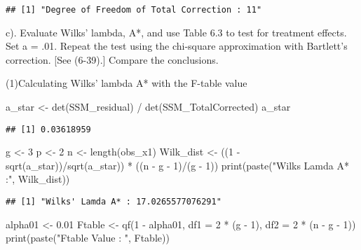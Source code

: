 \documentclass[
]{article}
\newenvironment{Shaded}{\begin{snugshade}}{\end{snugshade}}
\newcommand{\AttributeTok}[1]{\textcolor[rgb]{0.77,0.63,0.00}{#1}}
\newcommand{\DecValTok}[1]{\textcolor[rgb]{0.00,0.00,0.81}{#1}}
\newcommand{\FloatTok}[1]{\textcolor[rgb]{0.00,0.00,0.81}{#1}}
\newcommand{\FunctionTok}[1]{\textcolor[rgb]{0.00,0.00,0.00}{#1}}
\newcommand{\NormalTok}[1]{#1}
\newcommand{\OtherTok}[1]{\textcolor[rgb]{0.56,0.35,0.01}{#1}}
\newcommand{\SpecialCharTok}[1]{\textcolor[rgb]{0.00,0.00,0.00}{#1}}
\newcommand{\StringTok}[1]{\textcolor[rgb]{0.31,0.60,0.02}{#1}}
\begin{document}
\begin{verbatim}
## [1] "Degree of Freedom of Total Correction : 11"
\end{verbatim}

c). Evaluate Wilks' lambda, A*, and use Table 6.3 to test for treatment
effects. Set a = .01. Repeat the test using the chi-square approximation
with Bartlett's correction. {[}See (6-39).{]} Compare the conclusions.

(1)Calculating Wilks' lambda A* with the F-table value

\begin{Shaded}
\begin{Highlighting}[]
\NormalTok{a\_star }\OtherTok{\textless{}{-}} \FunctionTok{det}\NormalTok{(SSM\_residual) }\SpecialCharTok{/} \FunctionTok{det}\NormalTok{(SSM\_TotalCorrected)}
\NormalTok{a\_star}
\end{Highlighting}
\end{Shaded}

\begin{verbatim}
## [1] 0.03618959
\end{verbatim}

\begin{Shaded}
\begin{Highlighting}[]
\NormalTok{g }\OtherTok{\textless{}{-}} \DecValTok{3}
\NormalTok{p }\OtherTok{\textless{}{-}} \DecValTok{2}
\NormalTok{n }\OtherTok{\textless{}{-}} \FunctionTok{length}\NormalTok{(obs\_x1)}
\NormalTok{Wilk\_dist }\OtherTok{\textless{}{-}}\NormalTok{ ((}\DecValTok{1} \SpecialCharTok{{-}} \FunctionTok{sqrt}\NormalTok{(a\_star))}\SpecialCharTok{/}\FunctionTok{sqrt}\NormalTok{(a\_star)) }\SpecialCharTok{*}\NormalTok{ ((n }\SpecialCharTok{{-}}\NormalTok{ g }\SpecialCharTok{{-}} \DecValTok{1}\NormalTok{)}\SpecialCharTok{/}\NormalTok{(g }\SpecialCharTok{{-}} \DecValTok{1}\NormalTok{))}
\FunctionTok{print}\NormalTok{(}\FunctionTok{paste}\NormalTok{(}\StringTok{"Wilks\textquotesingle{} Lamda A* :"}\NormalTok{, Wilk\_dist))}
\end{Highlighting}
\end{Shaded}

\begin{verbatim}
## [1] "Wilks' Lamda A* : 17.0265577076291"
\end{verbatim}

\begin{Shaded}
\begin{Highlighting}[]
\NormalTok{alpha01 }\OtherTok{\textless{}{-}} \FloatTok{0.01}
\NormalTok{Ftable }\OtherTok{\textless{}{-}} \FunctionTok{qf}\NormalTok{(}\DecValTok{1} \SpecialCharTok{{-}}\NormalTok{ alpha01, }\AttributeTok{df1 =} \DecValTok{2} \SpecialCharTok{*}\NormalTok{ (g }\SpecialCharTok{{-}} \DecValTok{1}\NormalTok{), }\AttributeTok{df2 =} \DecValTok{2} \SpecialCharTok{*}\NormalTok{ (n }\SpecialCharTok{{-}}\NormalTok{ g }\SpecialCharTok{{-}} \DecValTok{1}\NormalTok{))}
\FunctionTok{print}\NormalTok{(}\FunctionTok{paste}\NormalTok{(}\StringTok{"Ftable Value : "}\NormalTok{, Ftable))}
\end{Highlighting}
\end{Shaded}
\end{document}

